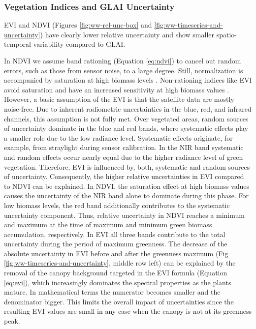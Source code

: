 \subsubsection{Vegetation Indices and \gls{GLAI} Uncertainty}

EVI and \gls{NDVI} (Figures \ref{fig:ww-rel-unc-box} and \ref{fig:ww-timeseries-and-uncertainty}) have clearly lower relative uncertainty and show smaller spatio-temporal variability compared to GLAI.

In \gls{NDVI} we assume band rationing (Equation \ref{eq:ndvi}) to cancel out random errors, such as those from sensor noise, to a large degree. Still, normalization is accompanied by saturation at high biomass levels \citep{prabhakara_evaluating_2015}. Non-rationing indices like \gls{EVI} avoid saturation and have an increased sensitivity at high biomass values \citep{huete_overview_2002}. However, a basic assumption of the \gls{EVI} is that the satellite data are mostly noise-free. Due to inherent radiometric uncertainties in the blue, red, and infrared channels, this assumption is not fully met. Over vegetated areas, random sources of uncertainty dominate in the blue and red bands, where systematic effects play a smaller role due to the low radiance level. Systematic effects originate, for example, from straylight during sensor calibration. In the NIR band systematic and random effects occur nearly equal due to the higher radiance level of green vegetation. Therefore, \gls{EVI} is influenced by, both, systematic and random sources of uncertainty. Consequently, the higher relative uncertainties in \gls{EVI} compared to \gls{NDVI} can be explained. In NDVI, the saturation effect at high biomass values causes the uncertainty of the NIR band alone to dominate during this phase. For low biomass levels, the red band additionally contributes to the systematic uncertainty component. Thus, relative uncertainty in \gls{NDVI} reaches a minimum and maximum at the time of maximum and minimum green biomass accumulation, respectively. In \gls{EVI} all three bands contribute to the total uncertainty during the period of maximum greenness. The decrease of the absolute uncertainty in \gls{EVI} before and after the greenness maximum (Fig \ref{fig:ww-timeseries-and-uncertainty}, middle row left) can be explained by the removal of the canopy background targeted in the \gls{EVI} formula (Equation \ref{eq:evi}), which increasingly dominates the spectral properties as the plants mature. In mathematical terms the numerator becomes smaller and the denominator bigger. This limits the overall impact of uncertainties since the resulting \gls{EVI} values are small in any case when the canopy is not at its greenness peak.


